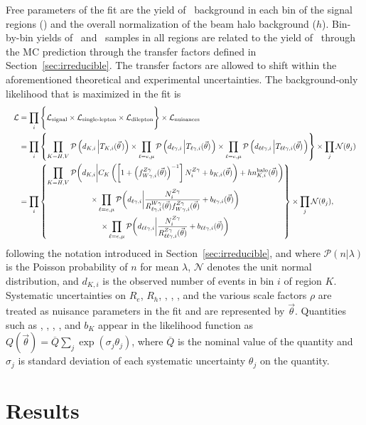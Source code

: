 Free parameters of the fit are the yield of \zinvg\ background in each bin of the signal regions (\NZg[i]) and the overall normalization of the beam halo background ($h$). 
Bin-by-bin yields of \wlng\ and \zllg\ samples in all regions are related to the yield of \zinvg\ through the MC prediction through the transfer factors defined in Section~\ref{sec:irreducible}. 
The transfer factors are allowed to shift within the aforementioned theoretical and experimental uncertainties.
The background-only likelihood that is maximized in the fit is
\begin{equation}
  \resizebox{\textwidth}{!}{$
    \begin{aligned}
      \mathcal{L} & = \prod_{i} \Bigg\{ \mathcal{L_{\text{signal}}} \times \mathcal{L_{\text{single-lepton}}} \times \mathcal{L_{\text{dilepton}}} \Bigg\} \times \mathcal{L_{\text{nuisances}}} \\
      & = \prod_{i} \left\{
      \prod_{K=H,V} \mathcal{P}\left( d_{K, i} \left| \TK[,i] (\vec{\theta} \right.) \right) \times \prod_{\ell=\Pe,\Pgm} \mathcal{P}\left( d_{\ell\Pgg, i} \left| \Tl[,i] (\vec{\theta}) \right. \right)
      \times \prod_{\ell=\Pe,\Pgm} \mathcal{P}\left( d_{\ell\ell\Pgg, i} \left| \Tll[,i] (\vec{\theta}) \right. \right)
      \right\}  \times \prod_{j} \mathcal{N}(\theta_j) \\
      & = \prod_{i} \left\{
      \begin{gathered}
        \prod\limits_{K=H,V} \mathcal{P}\biggl( d_{K, i} \biggl| C_{K} \left( \left[1 + \left(\fZW[,i](\vec{\theta})\right)^{-1}\right] \NZg[i] + b_{K, i}(\vec{\theta}) \right) + h \nhalo[,i](\vec{\theta}) \biggr. \biggr) \\
        \times \prod\limits_{\ell=\Pe,\Pgm} \mathcal{P}\biggl( d_{\ell\Pgg, i} \biggl| \frac{\NZg[i]}{\RWl[,i](\vec{\theta}) \fZW[,i] (\vec{\theta})} + b_{\ell\Pgg, i}(\vec{\theta}) \biggr. \biggr) \\
        \times \prod\limits_{\ell=\Pe,\Pgm} \mathcal{P}\biggl( d_{\ell\ell\Pgg, i} \biggl| \frac{\NZg[i]}{\RZll[,i](\vec{\theta})} + b_{\ell\ell\Pgg, i}(\vec{\theta}) \biggr. \biggr)
      \end{gathered} \right\}
      \times \prod_{j} \mathcal{N}(\theta_j),
    \end{aligned}
  $}
\end{equation}
following the notation introduced in Section~\ref{sec:irreducible}, and where $\mathcal{P}(n\vert\lambda)$ is the Poisson probability of $n$ for mean $\lambda$, $\mathcal{N}$ denotes the unit normal distribution, and $d_{K,i}$ is the observed number of events in bin $i$ of region $K$.
Systematic uncertainties on $R_e$, $R_h$, \kqcd, \ksudakov, \kphoton, and the various scale factors $\rho$ are treated as nuisance parameters in the fit and are represented by $\vec{\theta}$. 
Quantities such as \RZll, \RWl, \fZW, \nhalo, and $b_{K}$ appear in the likelihood function as $Q(\vec \theta) = \overline{Q} \sum\limits_{j}\exp(\sigma_{j}\theta_{j})$, where $\overline{Q}$ is the nominal value of the quantity and $\sigma_{j}$ is standard deviation of each systematic uncertainty $\theta_{j}$ on the quantity.

\section{Results}
\label{sec:results}


